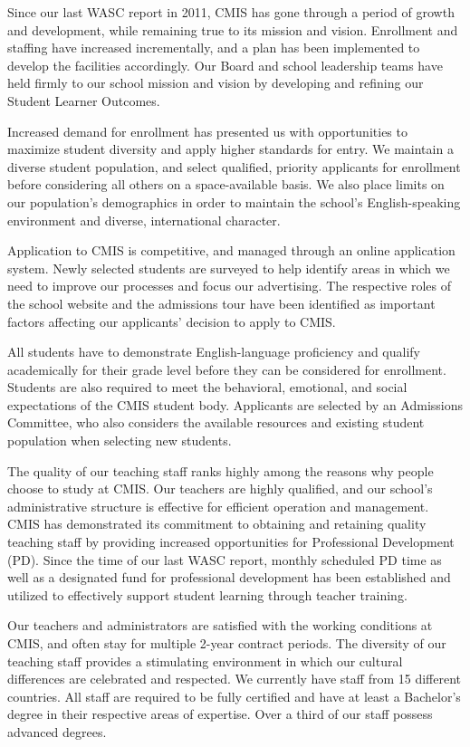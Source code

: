 Since our last WASC report in 2011, CMIS has gone through a period of growth and development, while remaining true to its mission and vision. Enrollment and staffing have increased incrementally, and a plan has been implemented to develop the facilities accordingly. Our Board and school leadership teams have held firmly to our school mission and vision by developing and refining our Student Learner Outcomes. 

Increased demand for enrollment has presented us with opportunities to maximize student diversity and apply higher standards for entry. We maintain a diverse student population, and select qualified, priority applicants for enrollment before considering all others on a space-available basis. We also place limits on our population's demographics in order to maintain the school's English-speaking environment and diverse, international character. 
 
Application to CMIS is competitive, and managed through an online application system. Newly selected students are surveyed to help identify areas in which we need to improve our processes and focus our advertising. The respective roles of the school website and the admissions tour have been identified as important factors affecting our applicants' decision to apply to CMIS. 

All students have to demonstrate English-language proficiency and qualify academically for their grade level before they can be considered for enrollment. Students are also required to meet the behavioral, emotional, and social expectations of the CMIS student body. Applicants are selected by an Admissions Committee, who also considers the available resources and existing student population when selecting new students.  

The quality of our teaching staff ranks highly among the reasons why people choose to study at CMIS. Our teachers are highly qualified, and our school's administrative structure is effective for efficient operation and management. CMIS has demonstrated its commitment to obtaining and retaining quality teaching staff by providing increased opportunities for Professional Development (PD). Since the time of our last WASC report, monthly scheduled PD time as well as a designated fund for professional development has been established and utilized to effectively support student learning through teacher training.

Our teachers and administrators are satisfied with the working conditions at CMIS, and often stay for multiple 2-year contract periods. The diversity of our teaching staff provides a stimulating environment in which our cultural differences are celebrated and respected. We currently have staff from 15 different countries. All staff are required to be fully certified and have at least a Bachelor's degree in their respective areas of expertise. Over a third of our staff possess advanced degrees.

